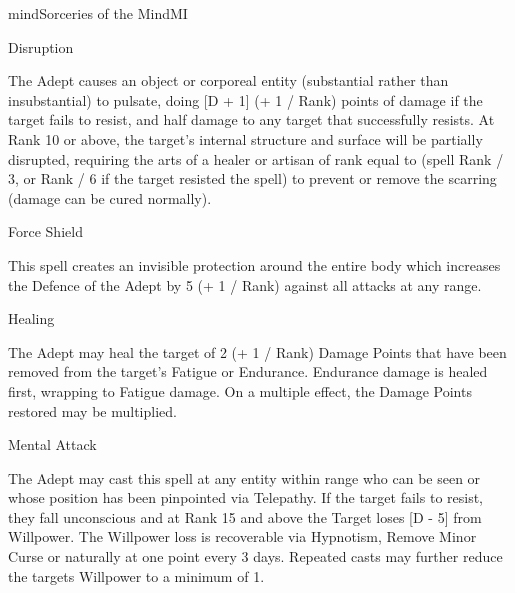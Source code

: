 \begin{College}[1.6]{mind}{Sorceries of the Mind}{MI}
\begin{spell}[S-1]{Disruption}

\begin{effects}
The Adept causes an object or corporeal entity (substantial rather
than insubstantial) to pulsate, doing [D + 1] (+ 1 / Rank) points of
damage if the target fails to resist, and half damage to any target
that successfully resists.  At Rank 10 or above, the target’s internal
structure and surface will be partially disrupted, requiring the arts
of a healer or artisan of rank equal to (spell Rank / 3, or Rank / 6
if the target resisted the spell) to prevent or remove the scarring
(damage can be cured normally).
\end{effects}
\end{spell}

\begin{spell}[S-2]{Force Shield}

\begin{effects}
This spell creates an invisible protection around the entire body
which increases the Defence of the Adept by 5 (+ 1 / Rank) against all
attacks at any range.
\end{effects}
\end{spell}

\begin{spell}[S-3]{Healing}

\begin{effects}
The Adept may heal the target of 2 (+ 1 / Rank) Damage Points that
have been removed from the target’s Fatigue or Endurance. Endurance
damage is healed first, wrapping to Fatigue damage.  On a multiple
effect, the Damage Points restored may be multiplied.
\end{effects}
\end{spell}

\begin{spell}[S-4]{Mental Attack}

\begin{effects}
The Adept may cast this spell at any entity within range who can be
seen or whose position has been pinpointed via Telepathy.  If the
target fails to resist, they fall unconscious and at Rank 15 and above
the Target loses [D - 5] from Willpower.  The Willpower loss is
recoverable via Hypnotism, Remove Minor Curse or naturally at one
point every 3 days.  Repeated casts may further reduce the targets
Willpower to a minimum of 1.
\end{effects}
\end{spell}


\end{College}
